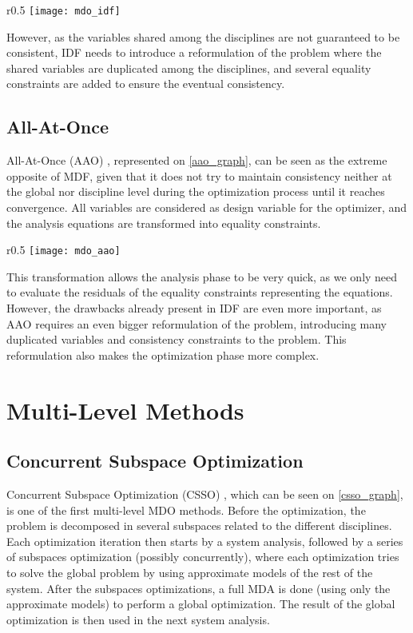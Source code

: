 \begin{wrapfigure}{r}{0.5\textwidth}
\centering
\texttt{[image: mdo\_idf]}
\caption{IDF method.}\label{idf_graph}
\end{wrapfigure}

However, as the variables shared among the disciplines are not guaranteed to be consistent, IDF needs to introduce a reformulation of the problem where the shared variables are duplicated among the disciplines, and several equality constraints are added to ensure the eventual consistency.

\subsection{All-At-Once}

All-At-Once (AAO) \cite{haftka1985simultaneous, cramer1994problem}, represented on \figurename{} \ref{aao_graph}, can be seen as the extreme opposite of MDF, given that it does not try to maintain consistency neither at the global nor discipline level during the optimization process until it reaches convergence.
All variables are considered as design variable for the optimizer, and the analysis equations are transformed into equality constraints.

\begin{wrapfigure}{r}{0.5\textwidth}
\centering
\texttt{[image: mdo\_aao]}
\caption{AAO method.}\label{aao_graph}
\end{wrapfigure}

This transformation allows the analysis phase to be very quick, as we only need to evaluate the residuals of the equality constraints representing the equations.
However, the drawbacks already present in IDF are even more important, as AAO requires an even bigger reformulation of the problem, introducing many duplicated variables and consistency constraints to the problem. This reformulation also makes the optimization phase more complex.

\section{Multi-Level Methods}

\subsection{Concurrent Subspace Optimization}

Concurrent Subspace Optimization (CSSO) \cite{wujek1997concurrent}, which can be seen on \figurename{} \ref{csso_graph}, is one of the first multi-level MDO methods. Before the optimization, the problem is decomposed in several subspaces related to the different disciplines. Each optimization iteration then starts by a system analysis, followed by a series of subspaces optimization (possibly concurrently), where each optimization tries to solve the global problem by using approximate models of the rest of the system. After the subspaces optimizations, a full MDA is done (using only the approximate models) to perform a global optimization. The result of the global optimization is then used in the next system analysis.

